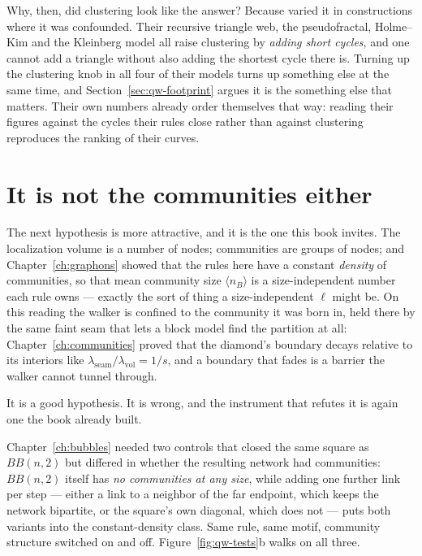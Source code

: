 Why, then, did clustering look like the answer? Because
\citet{boettcher2025localization} varied it in constructions where it was
confounded. Their recursive triangle web, the pseudofractal, Holme--Kim and the
Kleinberg model all raise clustering by \emph{adding short cycles}, and one cannot
add a triangle without also adding the shortest cycle there is. Turning up the
clustering knob in all four of their models turns up something else at the same
time, and Section~\ref{sec:qw-footprint} argues it is the something else that
matters. Their own numbers already order themselves that way: reading their figures
against the cycles their rules close rather than against clustering reproduces the
ranking of their curves.

\section{It is not the communities either}
\label{sec:qw-communities}

The next hypothesis is more attractive, and it is the one this book invites. The
localization volume is a number of nodes; communities are groups of nodes; and
Chapter~\ref{ch:graphons} showed that the rules here have a constant \emph{density}
of communities, so that mean community size $\langle n_B\rangle$ is a
size-independent number each rule owns --- exactly the sort of thing a
size-independent $\ell$ might be. On this reading the walker is confined to the
community it was born in, held there by the same faint seam that lets a block model
find the partition at all: Chapter~\ref{ch:communities} proved that the diamond's
boundary decays relative to its interiors like
$\lambda_{\mathrm{seam}}/\lambda_{\mathrm{vol}}=1/s$, and a boundary that fades is a
barrier the walker cannot tunnel through.

It is a good hypothesis. It is wrong, and the instrument that refutes it is again
one the book already built.

Chapter~\ref{ch:bubbles} needed two controls that closed the same square as
$BB(n,2)$ but differed in whether the resulting network had communities: $BB(n,2)$
itself has \emph{no communities at any size}, while adding one further link per step
--- either a link to a neighbor of the far endpoint, which keeps the network
bipartite, or the square's own diagonal, which does not --- puts both variants into
the constant-density class. Same rule, same motif, community structure switched on
and off. Figure~\ref{fig:qw-tests}b walks on all three.

